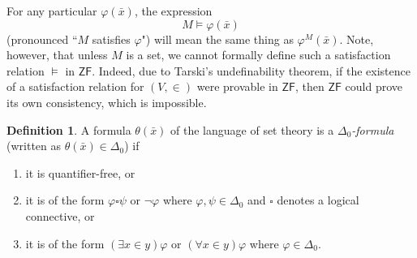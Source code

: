 \documentclass[10pt,letterpaper,cm]{nupset}
\theoremstyle{definition}
\newtheorem{definition}{Definition}[subsection]
\theoremstyle{theorem}
\theoremstyle{remark}
\newcommand{\1}{\mathbf{1}}
\newcommand{\0}{\vec 0}
\newcommand{\zf}{\mathsf{ZF}}
\newcommand{\be}{\begin{enumerate}}
\newcommand{\ee}{\end{enumerate}}
\begin{document}
\smallskip

For any particular $\varphi(\bar{x})$, the expression $$M \models \varphi(\bar{x})$$ (pronounced ``$M$ satisfies $\varphi$") will mean the same thing as $\varphi^M(\bar{x})$. Note, however, that unless $M$ is a set, we cannot formally define such a satisfaction relation $\models$ in $\zf$. Indeed, due to Tarski's undefinability theorem, if the existence of a satisfaction relation for $\left(V,\in\right)$ were provable in $\zf$, then $\zf$ could prove its own consistency, which is impossible. 

\smallskip

\begin{definition}\label{D0}
A formula $\theta(\bar{x})$ of the language of set theory is a \textit{$\Delta_0$-formula} (written as $\theta(\bar{x}) \in \Delta_0$) if
\be[label=(\alph*)]
\item it is quantifier-free, or
\item it is of the form $\varphi \square \psi$ or $\neg{\varphi}$ where $\varphi, \psi \in \Delta_0$ and $\square$ denotes a logical connective, or
\item it is of the form $\left(\exists x \in y\right)\varphi$ or $\left(\forall x \in y\right)\varphi$ where $\varphi \in \Delta_0$.
\ee
\end{definition}
\end{document}
